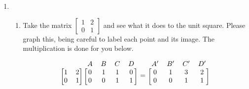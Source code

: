 \documentclass[../textbook.tex]{subfiles}
\begin{document}
\begin{enumerate}
\setcounter{enumi}{\value{problem_i}}
\item \begin{enumerate}
\item Take the matrix $\left[\begin{array}{cc}1 & 2 \\ 0 & 1\end{array}\right]$ and see what it does to the unit square. Please graph this, being careful to label each point and its image. The multiplication is done for you below.

$$\begin{blockarray}{cccccc}
& & A & B & C & D \\
\begin{block}{[cc][cccc]}
1 & 2 & 0 & 1 & 1 & 0 \\
0 & 1 & 0 & 0 & 1 & 1 \\
\end{block}
\end{blockarray} =
\begin{blockarray}{cccc}
A' & B' & C' & D' \\
\begin{block}{[cccc]}
0 & 1 & 3 & 2 \\
0 & 0 & 1 & 1 \\
\end{block}
\end{blockarray}$$


\end{enumerate}
\end{enumerate}
\end{document}
